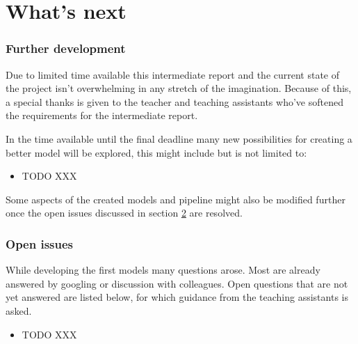 \part{What's next}
\label{part:whats_next}


\section{Further development}
\label{section:further_development}

Due to limited time available this intermediate report and the current state of the project isn't overwhelming in any stretch of the imagination.
Because of this, a special thanks is given to the teacher and teaching assistants who've softened the requirements for the intermediate report.

In the time available until the final deadline many new possibilities for creating a better model will be explored, this might include but is not limited to:
\begin{itemize}
    \item TODO XXX
\end{itemize}

Some aspects of the created models and pipeline might also be modified further once the open issues discussed in section \ref{section:open_issues} are resolved.


\section{Open issues}
\label{section:open_issues}

While developing the first models many questions arose. Most are already answered by googling or discussion with colleagues. Open questions that are not yet answered are listed below, for which guidance from the teaching assistants is asked.

\begin{itemize}
    \item TODO XXX
\end{itemize}